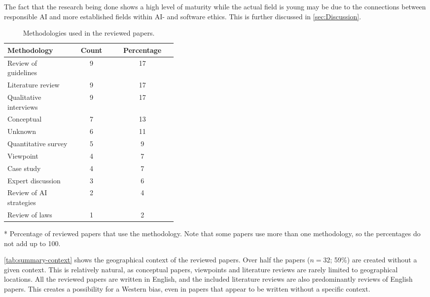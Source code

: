 The fact that the research being done shows a high level of maturity while the actual field is young may be due to the connections between responsible AI and more established fields within AI- and software ethics. This is further discussed in \autoref{sec:Discussion}.

\begin{table}[ht]
    \centering
    \caption{Methodologies used in the reviewed papers.}
    \label{tab:summary-methodology}
    \begin{threeparttable}
    \begin{tabular}{p{0.4\linewidth}cc}
    \toprule
        \textbf{Methodology} & \textbf{Count} & \textbf{Percentage}\tnote{*} \\
    \midrule
        Review of guidelines    & 9     & 17  \\
        Literature review       & 9     & 17  \\
        Qualitative interviews  & 9     & 17  \\
        Conceptual              & 7     & 13  \\
        Unknown                 & 6     & 11  \\
        Quantitative survey     & 5     & 9   \\
        Viewpoint               & 4     & 7   \\
        Case study              & 4     & 7   \\
        Expert discussion       & 3     & 6   \\
        Review of AI strategies & 2     & 4   \\
        Review of laws          & 1     & 2   \\
    \bottomrule
    \end{tabular}
    \begin{tablenotes}
        \footnotesize
        \item [*] Percentage of reviewed papers that use the methodology. Note that some papers use more than one methodology, so the percentages do not add up to 100.
    \end{tablenotes}
\end{threeparttable}
\end{table}

\autoref{tab:summary-context} shows the geographical context of the reviewed papers. Over half the papers ($n = 32$; 59\%) are created without a given context. This is relatively natural, as conceptual papers, viewpoints and literature reviews are rarely limited to geographical locations. All the reviewed papers are written in English, and the included literature reviews are also predominantly reviews of English papers. This creates a possibility for a Western bias, even in papers that appear to be written without a specific context.

